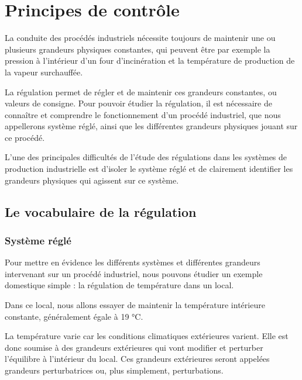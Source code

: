 \chapter{Principes de contrôle}



La conduite des procédés industriels nécessite toujours de maintenir une ou plusieurs grandeurs physiques constantes, qui peuvent être par exemple la pression à l’intérieur d’un four d’incinération et la température de production de la vapeur surchauffée.
\vspace{0.3cm}

La régulation permet de régler et de maintenir ces grandeurs constantes, ou valeurs de consigne.
Pour pouvoir étudier la régulation, il est nécessaire de connaître et comprendre le fonctionnement d’un procédé industriel, que nous appellerons système réglé, ainsi que les différentes grandeurs physiques jouant sur ce procédé.
\vspace{0.3cm}

L’une des principales difficultés de l’étude des régulations dans les systèmes de production industrielle est d’isoler le système réglé et de clairement identifier les grandeurs physiques qui agissent sur ce système.


\section{Le vocabulaire de la régulation}

\subsection{Système réglé}

Pour mettre en évidence les différents systèmes et différentes grandeurs intervenant sur un procédé industriel, nous pouvons étudier un exemple domestique simple : la régulation de température dans un local.
\vspace{0.3cm}

Dans ce local, nous allons essayer de maintenir la température intérieure constante, généralement égale à 19 °C.
\vspace{0.3cm}

La température varie car les conditions climatiques extérieures varient. Elle est donc soumise à des grandeurs extérieures qui vont modifier et perturber l’équilibre à l’intérieur du local. Ces grandeurs extérieures seront appelées grandeurs perturbatrices ou, plus simplement, perturbations. \vspace{0.3cm}

